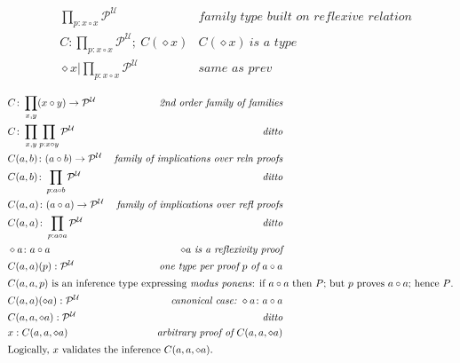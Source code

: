 \documentclass{article}
\begin{document}
\begin{align}
&\prod\limits_{p:x\circ x}\mathcal{P}^{\mathcal{U}} & \textit{family type built on reflexive relation} \\
&C\colon\!\prod\limits_{p:x\circ x}\mathcal{P}^{\mathcal{U}};\ C(\diamond x) & C(\diamond x)\ \textit{is a type} \\
&\diamond x\rvert\prod\limits_{p:x\circ x}\mathcal{P}^{\mathcal{U}} & \textit{same as prev}
\end{align}

\begin{align}
  &C\colon\prod\limits_{x,y}(x\circ y)\to\mathcal{P}^{\mathcal{U}} & \textit{2nd order family of families} \\
  &C\colon\prod\limits_{x,y}\prod\limits_{p:x\circ y}\mathcal{P}^{\mathcal{U}} & \textit{ditto} \\
  &C(a,b)\colon(a\circ b)\to\mathcal{P}^{\mathcal{U}} & \textit{family of implications over reln proofs} \\
  &C(a,b)\colon\prod\limits_{p:a\circ b}\mathcal{P}^{\mathcal{U}} & \textit{ditto} \\
  &C(a,a)\colon(a\circ a)\to\mathcal{P}^{\mathcal{U}} & \textit{family of implications over refl proofs} \\
  &C(a,a)\colon\prod\limits_{p:a\circ a}\mathcal{P}^{\mathcal{U}} & \textit{ditto} \\
  &\diamond a\colon a\circ a & \diamond a \ \textit{is a reflexivity proof} \\
  &C(a,a)(p):\mathcal{P}^{\mathcal{U}} & \textit{one type per proof}\ p\ \textit{of}\ a\circ a \\
\intertext{\(C(a,a,p)\) is an inference type expressing \textit{modus ponens}: if \(a\circ a\) then \(P\); but \(p\) proves \(a\circ a\); hence \(P\).}
  &C(a,a)(\diamond a):\mathcal{P}^{\mathcal{U}} & \textit{canonical case:}\ \diamond a\colon a\circ a \\
  &C(a,a,\diamond a):\mathcal{P}^{\mathcal{U}} & \textit{ditto} \\
&x:C(a,a,\diamond a) & \textit{arbitrary proof of}\ C(a,a,\diamond a) \\
\intertext{Logically, \(x\) validates the inference \(C(a,a,\diamond a)\).}
\end{align}

\end{document}
